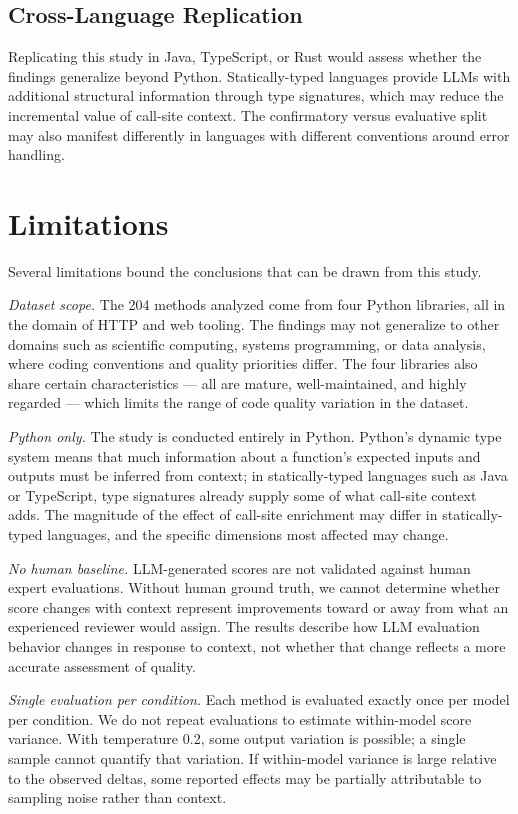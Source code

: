 \documentclass[12pt]{report}
\begin{document}
\subsection{Cross-Language Replication}

Replicating this study in Java, TypeScript, or Rust would assess whether the findings generalize beyond Python. Statically-typed languages provide LLMs with additional structural information through type signatures, which may reduce the incremental value of call-site context. The confirmatory versus evaluative split may also manifest differently in languages with different conventions around error handling.

\section{Limitations}

Several limitations bound the conclusions that can be drawn from this study.

\textit{Dataset scope.} The 204 methods analyzed come from four Python libraries, all in the domain of HTTP and web tooling. The findings may not generalize to other domains such as scientific computing, systems programming, or data analysis, where coding conventions and quality priorities differ. The four libraries also share certain characteristics --- all are mature, well-maintained, and highly regarded --- which limits the range of code quality variation in the dataset.

\textit{Python only.} The study is conducted entirely in Python. Python's dynamic type system means that much information about a function's expected inputs and outputs must be inferred from context; in statically-typed languages such as Java or TypeScript, type signatures already supply some of what call-site context adds. The magnitude of the effect of call-site enrichment may differ in statically-typed languages, and the specific dimensions most affected may change.

\textit{No human baseline.} LLM-generated scores are not validated against human expert evaluations. Without human ground truth, we cannot determine whether score changes with context represent improvements toward or away from what an experienced reviewer would assign. The results describe how LLM evaluation behavior changes in response to context, not whether that change reflects a more accurate assessment of quality.

\textit{Single evaluation per condition.} Each method is evaluated exactly once per model per condition. We do not repeat evaluations to estimate within-model score variance. With temperature 0.2, some output variation is possible; a single sample cannot quantify that variation. If within-model variance is large relative to the observed deltas, some reported effects may be partially attributable to sampling noise rather than context.
\end{document}
